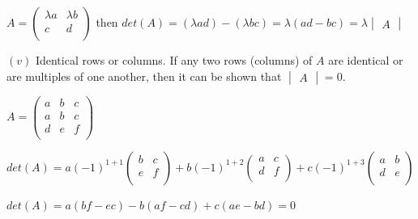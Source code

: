 \documentclass[fleqn]{article}
\begin{document}
\begin{enumerate}
    \textcolor{hwColor}{
      $
      A=\begin{pmatrix}
        \lambda a & \lambda b \\
        c & d \\
      \end{pmatrix}
      $
      then 
      $
      det(A)= (\lambda ad)-(\lambda bc)=\lambda (ad-bc)=\lambda \begin{vmatrix}
        A
      \end{vmatrix}
      $
    }

    \bigbreak

    $(v)$ Identical rows or columns. If any two rows (columns) of $A$ are identical or are multiples of one another, then it can be shown that $\begin{vmatrix}
      A
    \end{vmatrix}=0$.

    \textcolor{hwColor}{
      $
      A=\begin{pmatrix}
        a & b & c \\
        a & b & c \\
        d & e & f \\
      \end{pmatrix}
      $
    }

    \textcolor{hwColor}{
      $
      det(A)=a(-1)^{1+1}\begin{pmatrix}
        b & c \\
        e & f \\
      \end{pmatrix}
      +b(-1)^{1+2}\begin{pmatrix}
        a & c \\
        d & f \\
      \end{pmatrix}
      +c(-1)^{1+3}\begin{pmatrix}
        a & b \\
        d & e \\
      \end{pmatrix}
      $
    }

    \textcolor{hwColor}{
      $
      det(A)=a(bf-ec)-b(af-cd)+c(ae-bd)=0
      $
    }

    \bigbreak


\end{enumerate}
\end{document}
